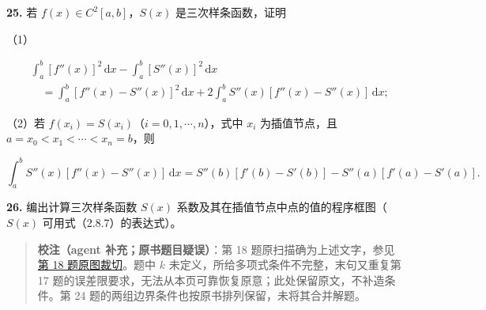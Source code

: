 \textbf{25.} 若 \(f(x)\in C^2[a,b]\)，\(S(x)\) 是三次样条函数，证明

（1）

\[\begin{aligned}
&\int_a^b[f''(x)]^2\,\mathrm dx-\int_a^b[S''(x)]^2\,\mathrm dx\\
&\quad=\int_a^b[f''(x)-S''(x)]^2\,\mathrm dx+2\int_a^b S''(x)[f''(x)-S''(x)]\,\mathrm dx;
\end{aligned}\]

（2）若 \(f(x_i)=S(x_i)\)（\(i=0,1,\cdots,n\)），式中 \(x_i\) 为插值节点，且 \(a=x_0<x_1<\cdots<x_n=b\)，则

\[\int_a^b S''(x)[f''(x)-S''(x)]\,\mathrm dx=S''(b)[f'(b)-S'(b)]-S''(a)[f'(a)-S'(a)].\]

\textbf{26.} 编出计算三次样条函数 \(S(x)\) 系数及其在插值节点中点的值的程序框图（\(S(x)\) 可用式（2.8.7）的表达式）。

\begin{quote}
\textbf{校注（agent 补充；原书题目疑误）}：第 18 题原扫描确为上述文字，参见\href{verified/assets/ch02b/pdf-057-exercise-18-detail.png}{第 18 题原图裁切}。题中 \(k\) 未定义，所给多项式条件不完整，末句又重复第 17 题的误差限要求，无法从本页可靠恢复原意；此处保留原文，不补造条件。第 24 题的两组边界条件也按原书排列保留，未将其合并解题。
\end{quote}

